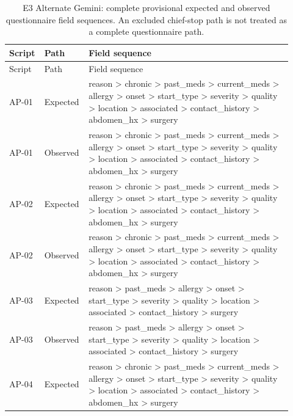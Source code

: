 \begingroup\small\setlength{\tabcolsep}{3pt}\renewcommand{\arraystretch}{1.15}
\begin{longtable}{>{\raggedright\arraybackslash}p{0.1\linewidth}>{\raggedright\arraybackslash}p{0.12\linewidth}>{\raggedright\arraybackslash}p{0.7\linewidth}}
\caption{E3 Alternate Gemini: complete provisional expected and observed questionnaire field sequences. An excluded chief-stop path is not treated as a complete questionnaire path.}\label{sup:e3pathsalternate}\\\hline
Script & Path & Field sequence \\ \hline
\endfirsthead
\hline
Script & Path & Field sequence \\ \hline
\endhead
\hline\endfoot
\hline\endlastfoot
AP-\allowbreak{}01 & Expected & reason > chronic > past\_\allowbreak{}meds > current\_\allowbreak{}meds > allergy > onset > start\_\allowbreak{}type > severity > quality > location > associated > contact\_\allowbreak{}history > abdomen\_\allowbreak{}hx > surgery \\
AP-\allowbreak{}01 & Observed & reason > chronic > past\_\allowbreak{}meds > current\_\allowbreak{}meds > allergy > onset > start\_\allowbreak{}type > severity > quality > location > associated > contact\_\allowbreak{}history > abdomen\_\allowbreak{}hx > surgery \\
AP-\allowbreak{}02 & Expected & reason > chronic > past\_\allowbreak{}meds > current\_\allowbreak{}meds > allergy > onset > start\_\allowbreak{}type > severity > quality > location > associated > contact\_\allowbreak{}history > abdomen\_\allowbreak{}hx > surgery \\
AP-\allowbreak{}02 & Observed & reason > chronic > past\_\allowbreak{}meds > current\_\allowbreak{}meds > allergy > onset > start\_\allowbreak{}type > severity > quality > location > associated > contact\_\allowbreak{}history > abdomen\_\allowbreak{}hx > surgery \\
AP-\allowbreak{}03 & Expected & reason > past\_\allowbreak{}meds > allergy > onset > start\_\allowbreak{}type > severity > quality > location > associated > contact\_\allowbreak{}history > surgery \\
AP-\allowbreak{}03 & Observed & reason > past\_\allowbreak{}meds > allergy > onset > start\_\allowbreak{}type > severity > quality > location > associated > contact\_\allowbreak{}history > surgery \\
AP-\allowbreak{}04 & Expected & reason > chronic > past\_\allowbreak{}meds > current\_\allowbreak{}meds > allergy > onset > start\_\allowbreak{}type > severity > quality > location > associated > contact\_\allowbreak{}history > abdomen\_\allowbreak{}hx > surgery \\

\end{longtable}
